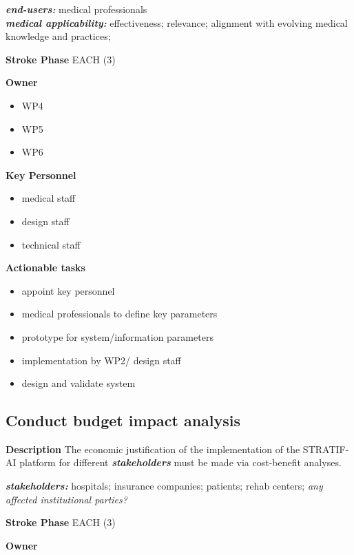 \documentclass[
  letterpaper,
  DIV=11,
  numbers=noendperiod]{scrreport}
\providecommand{\tightlist}{%
  \setlength{\itemsep}{0pt}\setlength{\parskip}{0pt}}\usepackage{longtable,booktabs,array}
\begin{document}
\textbf{\emph{end-users:}} medical professionals\\
\textbf{\emph{medical applicability:}} effectiveness; relevance;
alignment with evolving medical knowledge and practices;

\textbf{Stroke Phase} EACH (3)

\textbf{Owner}

\begin{itemize}
\tightlist
\item
  WP4
\item
  WP5
\item
  WP6
\end{itemize}

\textbf{Key Personnel}

\begin{itemize}
\tightlist
\item
  medical staff
\item
  design staff
\item
  technical staff
\end{itemize}

\textbf{Actionable tasks}

\begin{itemize}
\tightlist
\item
  appoint key personnel
\item
  medical professionals to define key parameters
\item
  prototype for system/information parameters
\item
  implementation by WP2/ design staff
\item
  design and validate system
\end{itemize}

\hypertarget{conduct-budget-impact-analysis}{%
\subsection{Conduct budget impact
analysis}\label{conduct-budget-impact-analysis}}

\textbf{Description} The economic justification of the implementation of
the STRATIF-AI platform for different \textbf{\emph{stakeholders}} must
be made via cost-benefit analyses.

\textbf{\emph{stakeholders:}} hospitals; insurance companies; patients;
rehab centers; \emph{any affected institutional parties?}

\textbf{Stroke Phase} EACH (3)

\textbf{Owner}
\end{document}
